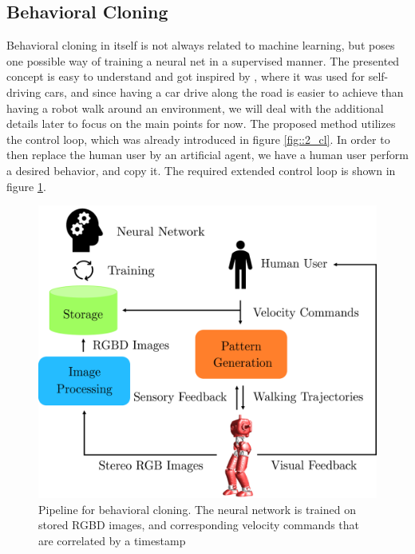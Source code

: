 \FloatBarrier
\subsection{Behavioral Cloning}
\label{sec::222_bc}
Behavioral cloning in itself is not always related to machine learning, but poses one possible way of training a neural net in a supervised manner. The presented concept is easy to understand and got inspired by \cite{bojarski2016end}, where it was used for self-driving cars, and since having a car drive along the road is easier to achieve than having a robot walk around an environment, we will deal with the additional details later to focus on the main points for now. The proposed method utilizes the control loop, which was already introduced in figure \ref{fig::2_cl}. In order to then replace the human user by an artificial agent, we have a human user perform a desired behavior, and copy it. The required extended control loop is shown in figure \ref{fig::222_bc}.
\begin{figure}[h!]
	\centering
	\includegraphics[scale=.5]{chapters/02_background/img/behavioral_cloning.png}
	\caption{Pipeline for behavioral cloning. The neural network is trained on stored RGBD images, and corresponding velocity commands that are correlated by a timestamp}
	\label{fig::222_bc}
\end{figure}
